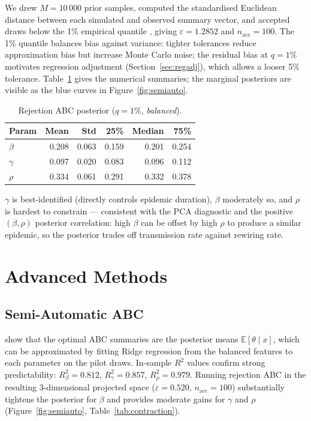 \documentclass[11pt, a4paper]{article}
\begin{document}
We drew $M=10\,000$ prior samples, computed the standardised Euclidean distance
between each simulated and observed summary vector, and accepted draws below the
1\% empirical quantile \citep{pritchard1999}, giving $\varepsilon=1.2852$ and
$n_\mathrm{acc}=100$.
The 1\% quantile balances bias against variance: tighter tolerances reduce approximation
bias but increase Monte Carlo noise; the residual bias at $q=1\%$ motivates
regression adjustment (Section~\ref{sec:regadj}), which allows a looser 5\% tolerance.
Table~\ref{tab:rabc} gives the numerical summaries; the marginal posteriors are
visible as the blue curves in Figure~\ref{fig:semiauto}.

\begin{table}[h]
\centering
\caption{Rejection ABC posterior ($q=1\%$, \emph{balanced}).}
\label{tab:rabc}
\begin{tabular}{lrrrrr}
\toprule
Param & Mean & Std & 25\% & Median & 75\% \\
\midrule
$\beta$  & 0.208 & 0.063 & 0.159 & 0.201 & 0.254 \\
$\gamma$ & 0.097 & 0.020 & 0.083 & 0.096 & 0.112 \\
$\rho$   & 0.334 & 0.061 & 0.291 & 0.332 & 0.378 \\
\bottomrule
\end{tabular}
\end{table}

$\gamma$ is best-identified (directly controls epidemic duration),
$\beta$ moderately so, and $\rho$ is hardest to constrain — consistent with
the PCA diagnostic and the positive $(\beta,\rho)$ posterior correlation:
high $\beta$ can be offset by high $\rho$ to produce a similar epidemic,
so the posterior trades off transmission rate against rewiring rate.

\section{Advanced Methods}
\label{sec:advanced}

\subsection{Semi-Automatic ABC \citep{fearnhead2012}}
\label{sec:semiauto}

\citet{fearnhead2012} show that the optimal ABC summaries are the
posterior means $\mathbb{E}[\theta\mid x]$, which can be approximated by
fitting Ridge regression from the balanced features to each parameter on
the pilot draws.
In-sample $R^2$ values confirm strong predictability:
$R^2_\beta=0.812$, $R^2_\gamma=0.857$, $R^2_\rho=0.979$.
Running rejection ABC in the resulting 3-dimensional projected space
($\varepsilon=0.520$, $n_\mathrm{acc}=100$) substantially tightens the
posterior for $\beta$ and provides moderate gains for $\gamma$ and $\rho$
(Figure~\ref{fig:semiauto}, Table~\ref{tab:contraction}).
\end{document}
